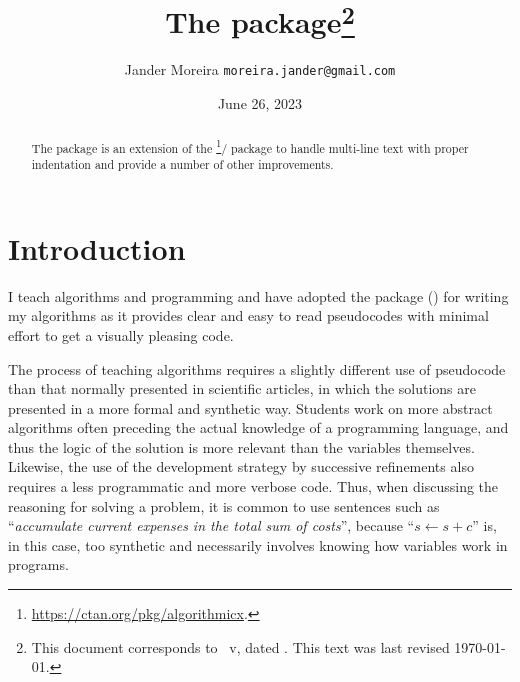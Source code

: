 \documentclass[a4paper, 11pt]{article}
\title{%
    The \PackageName{algxpar} package\thanks{This document corresponds to \PackageName{algxpar}~v\AlgVersion, dated \AlgDate.
    This text was last revised \today.}%
}
\author{Jander Moreira \texttt{moreira.jander@gmail.com}}
\date{June 26, 2023}
\begin{document}
\maketitle
\sloppy

\begin{abstract}
    The  package is an extension of the \footnote{\url{https://ctan.org/pkg/algorithmicx}.}/ package to handle multi-line text with proper indentation and provide a number of other improvements.
\end{abstract}

\tableofcontents

\begin{figure}
    \vspace{3em}
\end{figure}





\section{Introduction}
I teach algorithms and programming and have adopted the  package () for writing my algorithms as it provides clear and easy to read pseudocodes with minimal effort to get a visually pleasing code.

The process of teaching algorithms requires a slightly different use of pseudocode than that normally presented in scientific articles, in which the solutions are presented in a more formal and synthetic way. Students work on more abstract algorithms often preceding the actual knowledge of a programming language, and thus the logic of the solution is more relevant than the variables themselves. Likewise, the use of the development strategy by successive refinements also requires a less programmatic and more verbose code. Thus, when discussing the reasoning for solving a problem, it is common to use sentences such as ``\emph{accumulate current expenses in the total sum of costs}'', because ``${s \gets s + c}$'' is, in this case, too synthetic and necessarily involves knowing how variables work in programs.
\end{document}
